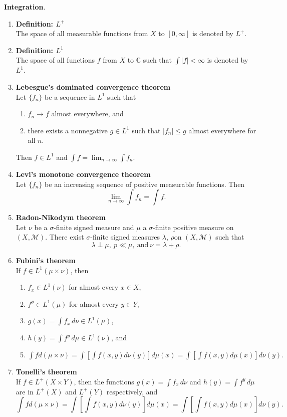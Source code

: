 \documentclass{article}
\begin{document}
\textbf{Integration}.
\begin{enumerate}
  \item \textbf{Definition: $L^+$}\\
    The space of all measurable functions from $X$ to $[0, \infty]$ is denoted
    by $L^+$.
  \item \textbf{Definition: $L^1$}\\
    The space of all functions $f$ from $X$ to $\mathbb C$ such that
    $\int |f| < \infty$ is denoted by $L^1$.
  \item \textbf{Lebesgue's dominated convergence theorem}\\
    Let $\{ f_n \}$ be a sequence in $L^1$ such that \begin{enumerate}
      \item $f_n \rightarrow f$ almost everywhere, and
      \item there exists a nonnegative $g \in L^1$ such that $|f_n| \leq g$
      almost everywhere for all $n$.
    \end{enumerate}
    Then $f \in L^1$ and $\int f = \lim_{n \rightarrow \infty} \int f_n$.
  \item \textbf{Levi's monotone convergence theorem}\\
    Let $\{ f_n \}$ be an increasing sequence of positive measurable functions.
    Then \[
      \lim_{n \rightarrow \infty} \int f_n = \int f.
    \]
  \item \textbf{Radon-Nikodym theorem}\\
    Let $\nu$ be a $\sigma$-finite signed measure and $\mu$ a $\sigma$-finite
    positive measure on $(X, \mathcal M)$. There exist $\sigma$-finite signed
    measures $\lambda$, $\rho$on $(X, \mathcal M)$ such that \[
      \lambda \perp \mu, \
      p \ll \mu, \
      \text{and} \
      \nu = \lambda + \rho.
    \]

  \item \textbf{Fubini's theorem}\\
    If $f \in L^1(\mu\times\nu)$, then
    \begin{enumerate}
      \item $f_x\in L^1(\nu)$ for almost every $x \in X$,
      \item $f^y\in L^1(\mu)$ for almost every $y \in Y$,
      \item $g(x) = \int f_x\, d\nu \in L^1(\mu)$,
      \item $h(y) = \int f^y\, d\mu \in L^1(\nu)$, and
      \item $\displaystyle
        \int f d(\mu\times\nu) =
        \int\left[\int f(x,y)d\nu(y)\right]d\mu(x) =
        \int\left[\int f(x,y)d\mu(x)\right]d\nu(y).
      $
    \end{enumerate}
  \item \textbf{Tonelli's theorem}\\
    If $f \in L^+(X\times Y)$, then the functions $g(x) = \int f_x\,d\nu$ and
    $h(y) = \int f^y\,d\mu$ are in $L^+(X)$ and $L^+(Y)$ respectively, and \[
      \int f d(\mu\times\nu) =
      \int\left[\int f(x,y)d\nu(y)\right]d\mu(x) =
      \int\left[\int f(x,y)d\mu(x)\right]d\nu(y).
    \]


\end{enumerate}
\end{document}
